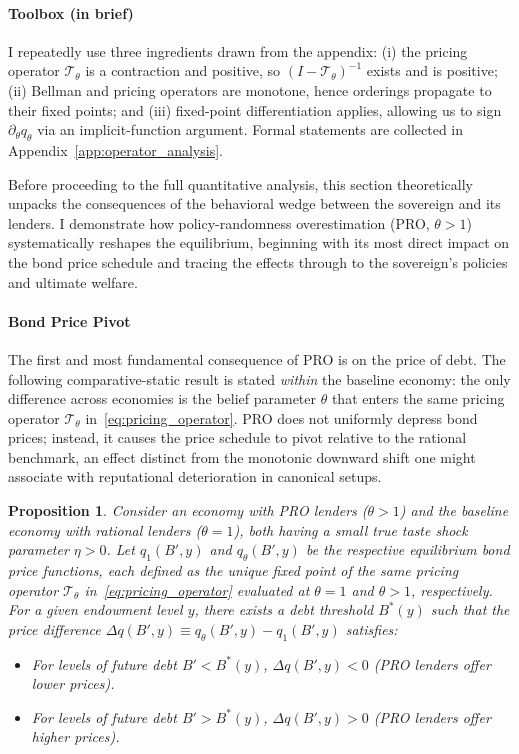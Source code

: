\documentclass[12pt]{article}
\theoremstyle{plain}
\newtheorem{proposition}{Proposition}
\begin{document}
\paragraph{Toolbox (in brief)}
I repeatedly use three ingredients drawn from the appendix: (i) the pricing
operator $\mathcal T_\theta$ is a contraction and positive, so $(I-\mathcal
	T_\theta)^{-1}$ exists and is positive; (ii) Bellman and pricing operators are
monotone, hence orderings propagate to their fixed points; and (iii)
fixed-point differentiation applies, allowing us to sign $\partial_\theta
	q_\theta$ via an implicit-function argument. Formal statements are collected in
Appendix~\ref{app:operator_analysis}.

Before proceeding to the full quantitative analysis, this section theoretically
unpacks the consequences of the behavioral wedge between the sovereign and its
lenders. I demonstrate how policy-randomness overestimation (PRO, $\theta > 1$)
systematically reshapes the equilibrium, beginning with its most direct impact
on the bond price schedule and tracing the effects through to the sovereign's
policies and ultimate welfare.

\paragraph{Bond Price Pivot}The first and most fundamental consequence of PRO is on the price of debt. The
following comparative-static result is stated \emph{within} the baseline
economy: the only difference across economies is the belief parameter $\theta$
that enters the same pricing operator $\mathcal T_\theta$
in~\eqref{eq:pricing_operator}. PRO does not uniformly depress bond prices;
instead, it causes the price schedule to pivot relative to the rational
benchmark, an effect distinct from the monotonic downward shift one might
associate with reputational deterioration in canonical setups.

\begin{proposition}\label{prop:pivot_concise}
	Consider an economy with PRO lenders ($\theta > 1$) and the baseline economy with rational lenders ($\theta = 1$), both having a small true taste shock parameter $\eta > 0$. Let $q_1(B', y)$ and $q_\theta(B', y)$ be the respective equilibrium bond price functions, each defined as the unique fixed point of the \emph{same} pricing operator $\mathcal T_\theta$ in~\eqref{eq:pricing_operator} evaluated at $\theta=1$ and $\theta>1$, respectively. For a given endowment level $y$, there exists a debt threshold $B^*(y)$ such that the price difference $\Delta q(B', y) \equiv q_\theta(B', y) - q_1(B', y)$ satisfies:
	\begin{itemize}
		\item For levels of future debt $B' < B^*(y)$, $\Delta q(B', y) < 0$ (PRO lenders
		      offer lower prices).
		\item For levels of future debt $B' > B^*(y)$, $\Delta q(B', y) > 0$ (PRO lenders
		      offer higher prices).
	\end{itemize}
\end{proposition}
\end{document}
